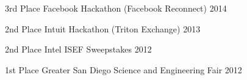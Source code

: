 

\begin{cvhonors}
  \cvhonor
    {3rd Place} %
    {Facebook Hackathon (Facebook Reconnect)} %
    {} %
    {2014} %
    
  \cvhonor
    {2nd Place} %
    {Intuit Hackathon (Triton Exchange)} %
    {} %
    {2013} %
    
  \cvhonor
    {2nd Place} %
    {Intel ISEF Sweepstakes} %
    {} %
    {2012} %
    
  \cvhonor
    {1st Place} %
    {Greater San Diego Science and Engineering Fair} %
    {} %
    {2012} %
    
\end{cvhonors}
